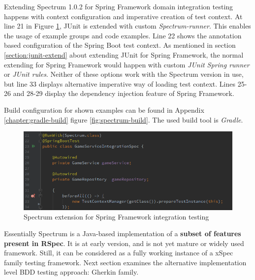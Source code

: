     Extending Spectrum 1.0.2 for Spring Framework domain integration testing happens with context configuration and imperative
    creation of test context. At line 21 in Figure \ref{fig:spectrum-init}, JUnit is extended with custom \textit{Spectrum-runner}.
    This enables the usage of example groups and code examples. Line 22 shows the annotation based configuration of the Spring Boot
    test context. As mentioned in section \ref{section:junit-extend} about extending JUnit for Spring Framework,
    the normal extending for Spring Framework would
    happen with custom \textit{JUnit Spring runner} or \textit{JUnit rules}. Neither of these options work with the Spectrum version in use,
    but line 33 displays alternative imperative way of loading test context. Lines 25-26 and 28-29 display the dependency
    injection feature of Spring Framework.

    Build configuration for shown examples can be found in Appendix \ref{chapter:gradle-build} figure \ref{fig:spectrum-build}.
    The used build tool is \textit{Gradle}.

    \begin{figure}[ht]
      \begin{center}
        \includegraphics[width=13.7cm]{images/spectrum-init.png}
        \caption{Spectrum extension for Spring Framework integration testing}
        \label{fig:spectrum-init}
      \end{center}
    \end{figure}

    Essentially Spectrum is a Java-based implementation of a \textbf{subset of features present in RSpec}. It is at early version,
    and is not yet mature or widely used framework. Still, it can be considered as a fully working instance of a xSpec family
    testing framework. Next section examines the alternative implementation level BDD testing approach: Gherkin family.



